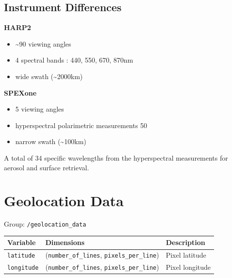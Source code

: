 \documentclass[
  11pt,
  letterpaper,
]{scrreprt}
\providecommand{\tightlist}{%
  \setlength{\itemsep}{0pt}\setlength{\parskip}{0pt}}
\begin{document}
\subsection{Instrument Differences}\label{instrument-differences}

\textbf{HARP2}

\begin{itemize}
\tightlist
\item
  \textasciitilde90 viewing angles\\
\item
  4 spectral bands : 440, 550, 670, 870nm
\item
  wide swath (\textasciitilde2000km)
\end{itemize}

\textbf{SPEXone}

\begin{itemize}
\tightlist
\item
  5 viewing angles\\
\item
  hyperspectral polarimetric measurements 50
\item
  narrow swath (\textasciitilde100km)
\end{itemize}

A total of 34 specific wavelengths from the hyperspectral measurements
for aerosol and surface retrieval.

\section{Geolocation Data}\label{geolocation-data}

Group: \texttt{/geolocation\_data}

\begin{longtable}[]{@{}
  >{\raggedright\arraybackslash}p{}
  >{\raggedright\arraybackslash}p{}
  >{\raggedright\arraybackslash}p{}@{}}
\toprule\noalign{}
\begin{minipage}[b]{\linewidth}\raggedright
Variable
\end{minipage} & \begin{minipage}[b]{\linewidth}\raggedright
Dimensions
\end{minipage} & \begin{minipage}[b]{\linewidth}\raggedright
Description
\end{minipage} \\
\midrule\noalign{}
\endhead
\bottomrule\noalign{}
\endlastfoot
\texttt{latitude} & (\texttt{number\_of\_lines},
\texttt{pixels\_per\_line}) & Pixel latitude \\
\texttt{longitude} & (\texttt{number\_of\_lines},
\texttt{pixels\_per\_line}) & Pixel longitude \\
\end{longtable}
\end{document}
